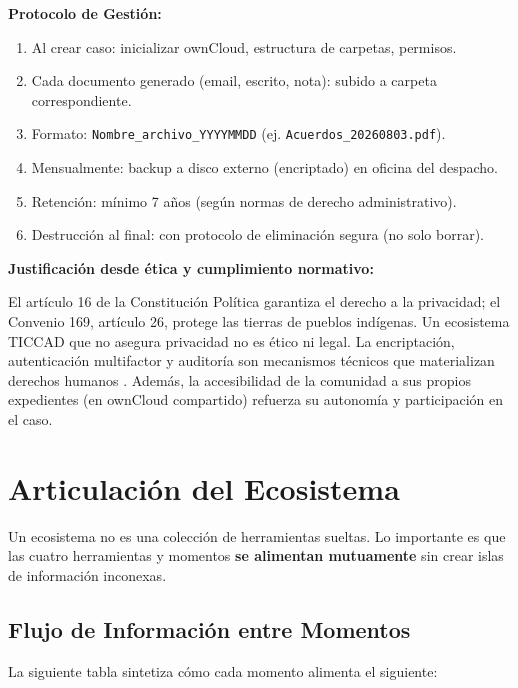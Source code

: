﻿\documentclass[
  spanish,
  letterpaper, oneside
]{article}
\begin{document}
\textbf{Protocolo de Gestión:}

\begin{enumerate}
  \item Al crear caso: inicializar ownCloud, estructura de carpetas, permisos.
  \item Cada documento generado (email, escrito, nota): subido a carpeta correspondiente.
  \item Formato: \verb|Nombre_archivo_YYYYMMDD| (ej. \verb|Acuerdos_20260803.pdf|).
  \item Mensualmente: backup a disco externo (encriptado) en oficina del despacho.
  \item Retención: mínimo 7 años (según normas de derecho administrativo). 
  \item Destrucción al final: con protocolo de eliminación segura (no solo borrar).
\end{enumerate}

\textbf{Justificación desde ética y cumplimiento normativo:}

El artículo 16 de la Constitución Política garantiza el derecho a la privacidad; el Convenio 169, 
artículo 26, protege las tierras de pueblos indígenas. Un ecosistema TICCAD que no asegura 
privacidad no es ético ni legal. La encriptación, autenticación multifactor y auditoría son 
mecanismos técnicos que materializan derechos humanos \cite{leyDerechosLinguisticos2024,oit1691989,cpeum2026}. 
Además, la accesibilidad de la comunidad a sus propios expedientes (en ownCloud compartido) 
refuerza su autonomía y participación en el caso.

\section{Articulación del Ecosistema}

Un ecosistema no es una colección de herramientas sueltas. Lo importante es que las cuatro 
herramientas y momentos \textbf{se alimentan mutuamente} sin crear islas de información 
inconexas.

\subsection{Flujo de Información entre Momentos}

La siguiente tabla sintetiza cómo cada momento alimenta el siguiente:
\end{document}
